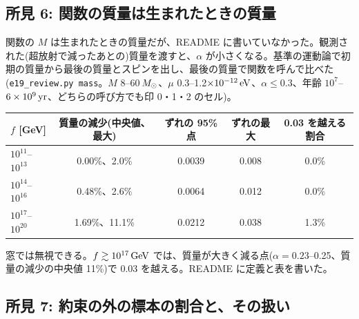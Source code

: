 \subsection{所見 6: 関数の質量は生まれたときの質量}

関数の $M$ は生まれたときの質量だが、README に書いていなかった。観測された(超放射で減ったあとの)質量を渡すと、$\alpha$ が小さくなる。基準の運動論で初期の質量から最後の質量とスピンを出し、最後の質量で関数を呼んで比べた(\texttt{e19\_review.py mass}。$M$ 8--60$\,M_\odot$、$\mu$ 0.3--1.2$\times10^{-12}\,\mathrm{eV}$、$\alpha\le0.3$、年齢 $10^7$--$6\times10^9\,\mathrm{yr}$、どちらの呼び方でも印 0・1・2 のセル)。
\begin{center}\small
\begin{tabular}{lcccc}
\toprule
$f$ [GeV] & 質量の減少(中央値、最大) & ずれの 95\% 点 & ずれの最大 & 0.03 を越える割合\\
\midrule
$10^{11}$--$10^{13}$ & 0.00\%、2.0\% & 0.0039 & 0.008 & 0.0\%\\
$10^{14}$--$10^{16}$ & 0.48\%、2.6\% & 0.0064 & 0.012 & 0.0\%\\
$10^{17}$--$10^{20}$ & 1.69\%、11.1\% & 0.0212 & 0.038 & 1.3\%\\
\bottomrule
\end{tabular}
\end{center}
窓では無視できる。$f\gtrsim10^{17}\,\mathrm{GeV}$ では、質量が大きく減る点($\alpha=0.23$--0.25、質量の減少の中央値 11\%)で 0.03 を越える。README に定義と表を書いた。

\subsection{所見 7: 約束の外の標本の割合と、その扱い}

